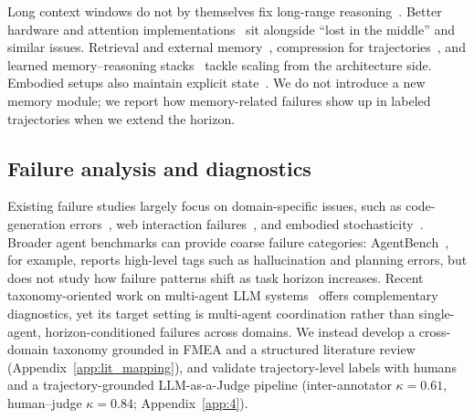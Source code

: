 \documentclass[11pt]{article}
\begin{document}
Long context windows do not by themselves fix long-range reasoning~\citep{liu2023lost}. Better hardware and attention implementations~\citep{press2022train,dao2022flashattention} sit alongside ``lost in the middle'' and similar issues. Retrieval and external memory~\citep{madaan2022memory,lewis2020retrieval,park2023generative}, compression for trajectories~\citep{kang2025acon}, and learned memory--reasoning stacks~\citep{zhou2025mem1} tackle scaling from the architecture side. Embodied setups also maintain explicit state~\citep{wang2023voyager,ahn2022saycan}. We do not introduce a new memory module; we report how memory-related failures show up in labeled trajectories when we extend the horizon.


\subsection{Failure analysis and diagnostics}

Existing failure studies largely focus on domain-specific issues, such as code-generation errors~\citep{chen2023teaching}, web interaction failures~\citep{koh2024visualwebarena}, and embodied stochasticity~\citep{zeng2020tossingbot}.
Broader agent benchmarks can provide coarse failure categories: AgentBench~\citep{liu2023agentbench}, for example, reports high-level tags such as hallucination and planning errors, but does not study how failure patterns shift as task horizon increases.
Recent taxonomy-oriented work on multi-agent LLM systems~\citep{cemri2025multiagentllmsystemsfail} offers complementary diagnostics, yet its target setting is multi-agent coordination rather than single-agent, horizon-conditioned failures across domains.
We instead develop a cross-domain taxonomy grounded in FMEA and a structured literature review (Appendix~\ref{app:lit_mapping}), and validate trajectory-level labels with humans and a trajectory-grounded LLM-as-a-Judge pipeline (inter-annotator \(\kappa{=}0.61\), human--judge \(\kappa{=}0.84\); Appendix~\ref{app:4}). 
\end{document}
